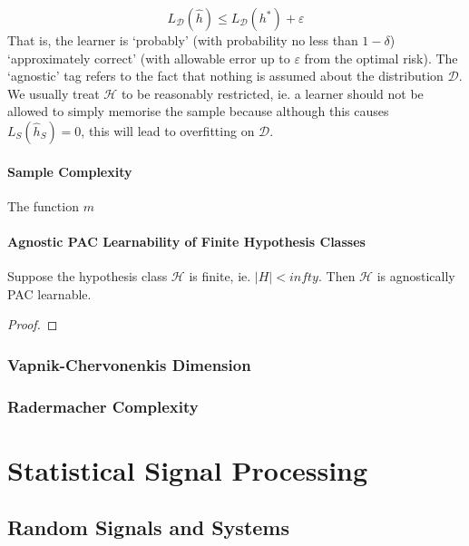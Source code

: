 \documentclass[11pt]{report} %
\begin{document}
\begin{equation}
L_{\mathcal{D}}\left(\widehat{h}\right) \leq L_{\mathcal{D}}\left(h^{*}\right) + \varepsilon
\end{equation}
That is, the learner is `probably' (with probability no less than $1 - \delta$) `approximately correct' (with allowable error up to $\varepsilon$ from the optimal risk). The `agnostic' tag refers to the fact that nothing is assumed about the distribution $\mathcal{D}$. We usually treat $\mathcal{H}$ to be reasonably restricted, ie. a learner should not be allowed to simply memorise the sample because although this causes $L_{S}\left(\widehat{h}_{S}\right) = 0$, this will lead to overfitting on $\mathcal{D}$.

\subsubsection{Sample Complexity}

The function $m$

\subsubsection{Agnostic PAC Learnability of Finite Hypothesis Classes}

\begin{theorem}
Suppose the hypothesis class $\mathcal{H}$ is finite, ie. $\left|H\right| < infty$. Then $\mathcal{H}$ is agnostically PAC learnable.
\end{theorem}
\begin{proof}

\end{proof}

\subsection{Vapnik-Chervonenkis Dimension}

\subsection{Radermacher Complexity}

\chapter{Statistical Signal Processing}

\section{Random Signals and Systems}
\end{document}
